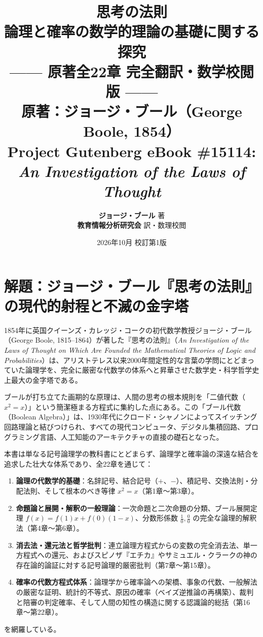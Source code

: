 \documentclass[a4paper,11pt,openany]{ltjsbook}
\title{\Huge\textbf{思考の法則}\\[4mm]
\huge\textbf{論理と確率の数学的理論の基礎に関する探究}\\[6mm]
\Large\textbf{—— 原著全22章 完全翻訳・数学校閲版 ——}\\[5mm]
\large 原著：ジョージ・ブール（George Boole, 1854）\\[2mm]
\normalsize Project Gutenberg eBook \#15114: \textit{An Investigation of the Laws of Thought}}
\author{\textbf{ジョージ・ブール} 著\\[2mm]
\textbf{教育情報分析研究会} 訳・数理校閲}
\date{2026年10月 校訂第1版}
\begin{document}
\maketitle

\frontmatter

\chapter*{解題：ジョージ・ブール『思考の法則』の現代的射程と不滅の金字塔}

1854年に英国クイーンズ・カレッジ・コークの初代数学教授ジョージ・ブール（George Boole, 1815--1864）が著した『思考の法則』（\textit{An Investigation of the Laws of Thought on Which Are Founded the Mathematical Theories of Logic and Probabilities}）は、アリストテレス以来2000年間定性的な言葉の学問にとどまっていた論理学を、完全に厳密な代数学の体系へと昇華させた数学史・科学哲学史上最大の金字塔である。

ブールが打ち立てた画期的な原理は、人間の思考の根本規則を「二値代数（$x^2 = x$）」という簡潔極まる方程式に集約した点にある。この「ブール代数（Boolean Algebra）」は、1930年代にクロード・シャノンによってスイッチング回路理論と結びつけられ、すべての現代コンピュータ、デジタル集積回路、プログラミング言語、人工知能のアーキテクチャの直接の礎石となった。

本書は単なる記号論理学の教科書にとどまらず、論理学と確率論の深遠な結合を追求した壮大な体系であり、全22章を通じて：
\begin{enumerate}[label=\textbf{\arabic*.}]
    \item \textbf{論理の代数学的基礎}：名辞記号、結合記号（$+$、$-$）、積記号、交換法則・分配法則、そして根本のべき等律 $x^2 = x$（第1章〜第3章）。
    \item \textbf{命題論と展開・解釈の一般理論}：一次命題と二次命題の分類、ブール展開定理 $f(x) = f(1)x + f(0)(1-x)$、分数形係数 $\frac{1}{0}, \frac{0}{0}$ の完全な論理的解釈法（第4章〜第6章）。
    \item \textbf{消去法・還元法と哲学批判}：連立論理方程式からの変数の完全消去法、単一方程式への還元、およびスピノザ『エチカ』やサミュエル・クラークの神の存在論的論証に対する記号論理的厳密批判（第7章〜第15章）。
    \item \textbf{確率の代数方程式体系}：論理学から確率論への架橋、事象の代数、一般解法の厳密な証明、統計的不等式、原因の確率（ベイズ逆推論の再構築）、裁判と陪審の判定確率、そして人間の知性の構造に関する認識論的総括（第16章〜第22章）。
\end{enumerate}
を網羅している。
\end{document}
